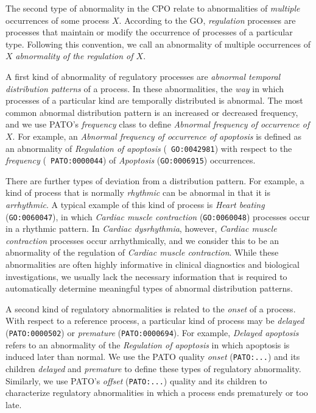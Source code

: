 \documentclass{bioinfo}
\begin{document}
The second type of abnormality in the CPO relate to abnormalities of
{\em multiple} occurrences of some process $X$. According to the GO,
{\em regulation} processes are processes that maintain or modify the
occurrence of processes of a particular type. Following this
convention, we call an abnormality of multiple occurrences of $X$ {\em
  abnormality of the regulation of $X$}.

A first kind of abnormality of regulatory processes are {\em abnormal
  temporal distribution patterns} of a process. In these
abnormalities, the {\em way} in which processes of a particular kind
are temporally distributed is abnormal.  The most common abnormal
distribution pattern is an increased or decreased frequency, and we
use PATO's {\em frequency} class to define {\em Abnormal frequency of
  occurrence of $X$}.
For example, an {\em Abnormal frequency of occurrence of apoptosis} is
defined as an abnormality of {\em Regulation of apoptosis} ({\tt
  GO:0042981}) with respect to the {\em frequency} ({\tt
  PATO:0000044}) of {\em Apoptosis} ({\tt GO:0006915}) occurrences.

There are further types of deviation from a distribution pattern. For
example, a kind of process that is normally {\em rhythmic} can be
abnormal in that it is {\em arrhythmic}. A typical example of this
kind of process is {\em Heart beating} ({\tt GO:0060047}), in which
{\em Cardiac muscle contraction} ({\tt GO:0060048}) processes occur in
a rhythmic pattern. In {\em Cardiac dysrhythmia}, however, {\em
  Cardiac muscle contraction} processes occur arrhythmically, and we
consider this to be an abnormality of the regulation of {\em Cardiac
  muscle contraction}. While these abnormalities are often highly
informative in clinical diagnostics and biological investigations, we
usually lack the necessary information that is required to
automatically determine meaningful types of abnormal distribution
patterns.

A second kind of regulatory abnormalities is related to the {\em
  onset} of a process. With respect to a reference process, a
particular kind of process may be {\em delayed} ({\tt PATO:0000502})
or {\em premature} ({\tt PATO:0000694}). For example, {\em Delayed
  apoptosis} refers to an abnormality of the {\em Regulation of
  apoptosis} in which apoptosis is induced later than normal.  We use
the PATO quality {\em onset} ({\tt PATO:...}) and its children {\em
  delayed} and {\em premature} to define these types of regulatory
abnormality. Similarly, we use PATO's {\em offset} ({\tt PATO:...})
  quality and its children to characterize regulatory abnormalities in
  which a process ends prematurely or too late.
\end{document}
